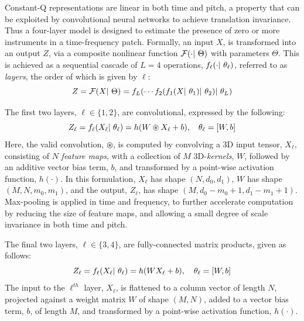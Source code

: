 \documentclass{article}
\begin{document}
Constant-Q representations are linear in both time and pitch, a property that can be exploited by convolutional neural networks to achieve translation invariance.
Thus a four-layer model is designed to estimate the presence of zero or more instruments in a time-frequency patch.
Formally, an input $X$, is transformed into an output $Z$, via a composite nonlinear
function $\mathcal{F}(\cdot |~ \Theta)$ with parameters $\Theta$.
This is achieved as a sequential cascade of $L=4$ operations, $f_\ell(\cdot |~
\theta_\ell)$, referred to as \emph{layers}, the order of which is given by $\ell$:
\begin{equation}
\label{eq:layers}
Z = \mathcal{F}(X |~ \Theta) = f_{L}(  \cdots f_2(f_1(X |~ \theta_1) |~ \theta_2) |~ \theta_{L})
\end{equation}

The first two layers, $\ell \in \{1, 2\}$, are convolutional, expressed by the following:
\begin{equation}
\label{eq:convlayer}
\small
Z_\ell = f_\ell(X_\ell \given \theta_\ell) = h(W \circledast X_\ell + b), \quad
\theta_\ell = [W, b]
\end{equation}
Here, the valid convolution, $\circledast$, is computed by convolving a 3D input tensor,
$X_\ell$, consisting of $N$ \emph{feature maps}, with a collection of $M$ 3D-\emph{kernels}, $W$, followed by an additive vector bias term, $b$, and transformed by a point-wise activation function, $h(\cdot)$.
In this formulation, $X_\ell$ has shape $(N, d_0, d_1)$, $W$ has shape $(M, N, m_0, m_1)$,
and the output, $Z_\ell$, has shape $(M, d_0-m_0+1, d_1-m_1+1)$.
Max-pooling is applied in time and frequency, to further accelerate computation by reducing the size of feature maps, and allowing a small degree of scale invariance in both time and pitch.

The final two layers, $\ell \in \{3, 4\}$, are fully-connected matrix products, given as follows:
\begin{equation}
\label{eq:fclayer}
Z_\ell = f_\ell(X_\ell |~ \theta_\ell) = h( WX_\ell + b), \quad \theta_\ell = [W, b]
\end{equation}
The input to the $\ell^{th}$ layer, $X_\ell$, is flattened to a column vector of length $N$, projected against a weight matrix $W$ of shape $(M, N)$, added to a vector bias term, $b$, of length $M$, and transformed by a point-wise activation function, $h(\cdot)$.
\end{document}
